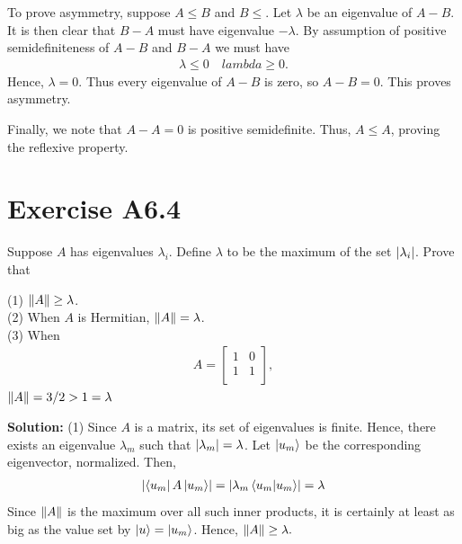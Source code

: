 \documentclass{book}
\begin{document}
    To prove asymmetry, suppose $A\leq B$ and $B \leq $. Let $\lambda$ be an eigenvalue of $A-B$. It is then clear that $B-A$ must have eigenvalue $-\lambda$. By assumption of positive semidefiniteness of $A-B$ and $B-A$ we must have 
    \begin{align}
        \lambda \leq 0 \quad lambda \geq 0.
    \end{align}
    Hence, $\lambda = 0$. Thus every eigenvalue of $A-B$ is zero, so $A - B = 0$. This proves asymmetry.
    
    Finally, we note that $A-A = 0$ is positive semidefinite. Thus, $A\leq A$, proving the reflexive property.

\section*{Exercise A6.4}
    Suppose $A$ has eigenvalues $\lambda_i$. Define $\lambda$ to be the maximum of the set $\abs{\lambda_i}$. Prove that
    
    (1) $\norm{A} \geq \lambda$. \\
    \indent (2) When $A$ is Hermitian, $\norm{A}=\lambda$. \\
    \indent (3) When
    \begin{align}
        A = 
        \begin{bmatrix}
            1 & 0 \\
            1 & 1 \\
        \end{bmatrix},
    \end{align}
    \indent $\norm{A}=3/2>1 = \lambda$
    
    \textbf{Solution:} (1) Since $A$ is a matrix, its set of eigenvalues is finite. Hence, there exists an eigenvalue $\lambda_m$ such that $\abs{\lambda_m} = \lambda$. Let $\ket{u_m}$ be the corresponding eigenvector, normalized. Then, 
    \begin{align}
        \abs{\bra{u_m}A\ket{u_m}} = \abs{\lambda_m \braket{u_m}{u_m}} = \lambda
    \end{align}
    Since $\norm{A}$ is the maximum over all such inner products, it is certainly at least as big as the value set by $\ket{u} = \ket{u_m}$. Hence, $\norm{A}\geq \lambda.$
    
\end{document}

